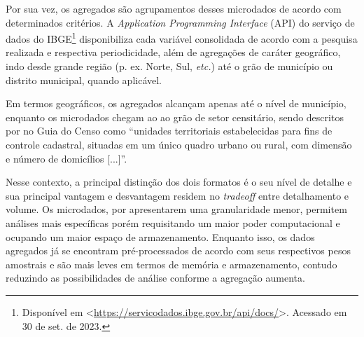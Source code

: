     Por sua vez, os agregados são agrupamentos desses microdados de acordo com determinados critérios. A \textit{Application Programming Interface} (API) do serviço de dados do IBGE\footnote{Disponível em <\url{https://servicodados.ibge.gov.br/api/docs/}>. Acessado em 30 de set. de 2023.} disponibiliza cada variável consolidada de acordo com a pesquisa realizada e respectiva periodicidade, além de agregações de caráter geográfico, indo desde grande região (p. ex. Norte, Sul, \textit{etc.}) até o grão de município ou distrito municipal, quando aplicável.

    Em termos geográficos, os agregados alcançam apenas até o nível de município, enquanto os microdados chegam ao ao grão de setor censitário, sendo descritos por \textcite{Guia-Censo-2010} no Guia do Censo como ``unidades territoriais estabelecidas para fins de controle cadastral, situadas em um único quadro urbano ou rural, com dimensão e número de domicílios [...]''.

    Nesse contexto, a principal distinção dos dois formatos é o seu nível de detalhe e sua principal vantagem e desvantagem residem no \textit{tradeoff} entre detalhamento e volume. Os microdados, por apresentarem uma granularidade menor, permitem análises mais específicas porém requisitando um maior poder computacional e ocupando um maior espaço de armazenamento. Enquanto isso, os dados agregados já se encontram pré-processados de acordo com seus respectivos pesos amostrais e são mais leves em termos de memória e armazenamento, contudo reduzindo as possibilidades de análise conforme a agregação aumenta.

    
    
